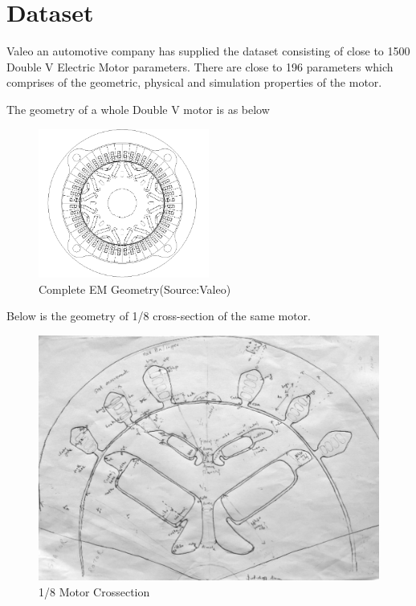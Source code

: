 \documentclass{report} %
\begin{document}
\newpage 

\chapter{Dataset} 
Valeo an automotive company has supplied the dataset consisting of close to 1500 Double V Electric Motor parameters. 
There are close to 196 parameters which comprises of the geometric, physical and simulation properties of the motor.

The geometry of a whole Double V motor is as below

\begin{figure}[H]
    \centering
    \includegraphics[width=0.5\textwidth]{./ReportImages/FullMotorv2.png} 
    \caption{Complete EM Geometry(Source:Valeo)}
    \label{fig:Full Motor}
\end{figure}

Below is the geometry of 1/8 cross-section of the same motor.

\begin{figure}[H]
    \centering
    \includegraphics[width=1\textwidth]{./ReportImages/EMCrosssectionFiltered.png} 
    \caption{1/8 Motor Crossection}
    \label{fig:1/8 Motor Crossection}
\end{figure}
\end{document}
